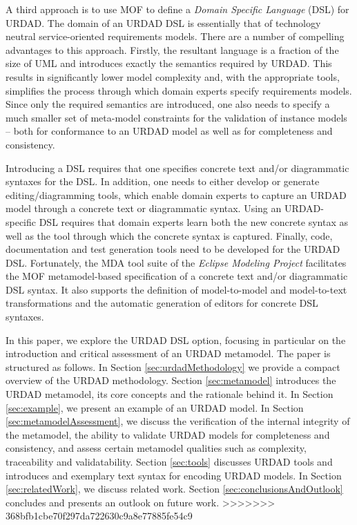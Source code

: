 A third approach is to use MOF to define a {\em Domain Specific Language} (DSL) for URDAD. The domain of an URDAD DSL is essentially that of technology neutral service-oriented requirements models. There are a number of compelling advantages to this approach. Firstly, the resultant language is a fraction of the size of UML and introduces exactly the semantics required by URDAD. This results in significantly lower model complexity and, with the appropriate tools, simplifies the process through which domain experts specify requirements models. Since only the required semantics are introduced, one also needs to specify a much smaller set of meta-model constraints for the validation of instance models -- both for conformance to an URDAD model as well as for completeness and consistency.

Introducing a DSL requires that one specifies concrete text and/or diagrammatic syntaxes for the DSL. In addition, one needs to either develop or generate editing/diagramming tools, which enable domain experts to capture an URDAD model through a concrete text or diagrammatic syntax. Using an URDAD-specific DSL requires that domain experts learn both the new concrete syntax as well as the tool through which the concrete syntax is captured. Finally, code, documentation and test generation tools need to be developed for the URDAD DSL. Fortunately, the MDA tool suite of the {\em Eclipse Modeling Project} \cite{} facilitates the MOF metamodel-based specification of a concrete text and/or diagrammatic DSL syntax. It also supports the definition of model-to-model and model-to-text transformations and the automatic generation of editors for concrete DSL syntaxes.

In this paper, we explore the URDAD DSL option, focusing in particular on the introduction and critical assessment of an URDAD metamodel. The paper is structured as follows. In Section \ref{sec:urdadMethodology} we provide a compact overview of the URDAD methodology. Section \ref{sec:metamodel} introduces the URDAD metamodel, its core concepts and the rationale behind it. In Section \ref{sec:example}, we present an example of an URDAD model. In Section \ref{sec:metamodelAssessment}, we discuss the verification of the internal integrity of the metamodel, the ability to validate URDAD models for completeness and consistency, and assess certain metamodel qualities such as complexity, traceability and validatability. Section \ref{sec:tools} discusses URDAD tools and introduces and exemplary text syntax for encoding URDAD models. In Section \ref{sec:relatedWork}, we discuss related work. Section \ref{sec:conclusionsAndOutlook} concludes and presents an outlook on future work.
>>>>>>> 368bfb1cbe70f297da722630c9a8e77885fe54c9

